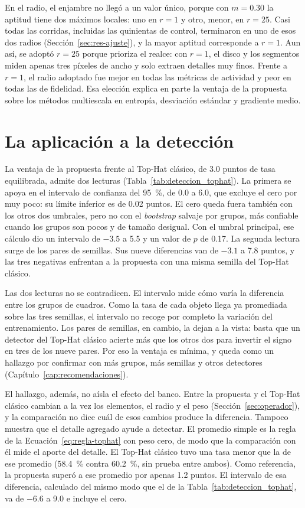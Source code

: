 En el radio, el enjambre no llegó a un valor único, porque con $m = 0.30$ la aptitud tiene dos máximos
locales: uno en $r = 1$ y otro, menor, en $r = 25$. Casi todas las corridas, incluidas las quinientas de
control, terminaron en uno de esos dos radios (Sección~\ref{sec:res-ajuste}), y la mayor aptitud
corresponde a $r = 1$. Aun así, se adoptó $r = 25$ porque prioriza el realce: con $r = 1$, el disco y
los segmentos miden apenas tres píxeles de ancho y solo extraen detalles muy finos. Frente a $r = 1$, el
radio adoptado fue mejor en todas las métricas de actividad y peor en todas las de fidelidad. Esa
elección explica en parte la ventaja de la propuesta sobre los métodos multiescala en entropía,
desviación estándar y gradiente medio.

\section{La aplicación a la detección}
\label{sec:disc-deteccion}

La ventaja de la propuesta frente al Top-Hat clásico, de 3.0 puntos de tasa equilibrada, admite dos
lecturas (Tabla~\ref{tab:deteccion_tophat}). La primera se apoya en el intervalo de confianza del
95~\%, de 0.0 a 6.0, que excluye el cero por muy poco: su límite inferior es de 0.02 puntos. El cero
queda fuera también con los otros dos umbrales, pero no con el \textit{bootstrap} salvaje por grupos,
más confiable cuando los grupos son pocos y de tamaño desigual. Con el umbral principal, ese cálculo
dio un intervalo de $-3.5$ a 5.5 y un valor de $p$ de 0.17. La segunda lectura surge de los pares de
semillas. Sus nueve diferencias van de $-3.1$ a 7.8 puntos, y las tres
negativas enfrentan a la propuesta con una misma semilla del Top-Hat clásico.

Las dos lecturas no se contradicen. El intervalo mide cómo varía la diferencia entre los grupos de
cuadros. Como la tasa de cada objeto llega ya promediada sobre las tres semillas, el intervalo no recoge
por completo la variación del entrenamiento. Los pares de semillas, en cambio, la dejan a la vista: basta que un
detector del Top-Hat clásico acierte más que los otros dos para invertir el signo en tres de los nueve
pares. Por eso la ventaja es mínima, y queda como un hallazgo por confirmar con más grupos, más semillas
y otros detectores (Capítulo~\ref{cap:recomendaciones}).

El hallazgo, además, no aísla el efecto del banco. Entre la propuesta y el Top-Hat clásico cambian a la vez
los elementos, el radio y el peso (Sección~\ref{sec:operador}), y la comparación no dice cuál de esos
cambios produce la diferencia. Tampoco muestra que el detalle agregado ayude a detectar. El promedio
simple es la regla de la Ecuación~\eqref{eq:regla-tophat} con peso cero, de modo que la comparación con
él mide el aporte del detalle. El Top-Hat clásico tuvo una tasa menor que la de ese promedio
(58.4~\% contra 60.2~\%, sin prueba entre ambos). Como referencia, la propuesta superó a ese promedio
por apenas 1.2 puntos. El intervalo de esa diferencia, calculado del mismo modo que el de la
Tabla~\ref{tab:deteccion_tophat}, va de $-6.6$ a 9.0 e incluye el cero.

